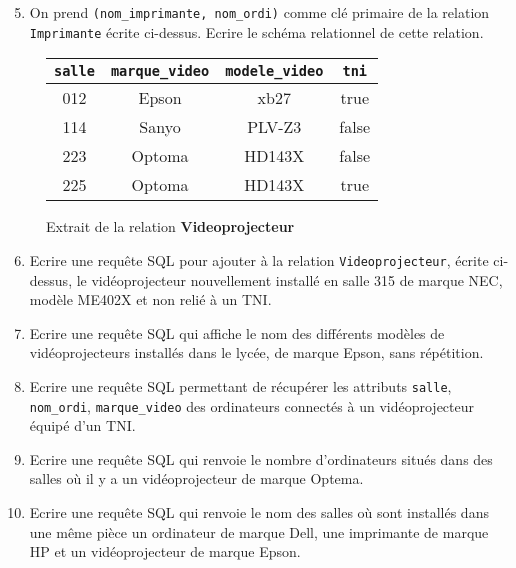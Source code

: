 \documentclass[11pt,a4paper,french,twoside]{PMCours}
\begin{document}
\begin{enumerate}
\setcounter{enumi}{4}

\item On prend \verb'(nom_imprimante, nom_ordi)' comme clé primaire de la relation \verb'Imprimante' écrite ci-dessus. Ecrire le schéma relationnel de cette relation.


\end{enumerate}


\begin{figure}[h]
\begin{center}
\begin{tabular}[c]{|c|c|c|c|}\hline
\verb'salle' & \verb'marque_video' & \verb'modele_video' & \verb'tni'  \\\hline
012 & Epson & xb27 & true  \\\hline
114 & Sanyo & PLV-Z3 & false  \\\hline
223 & Optoma & HD143X & false  \\\hline
225 & Optoma & HD143X & true  \\\hline
\end{tabular}
\end{center}
\caption{Extrait de la relation \textbf{Videoprojecteur}}
\end{figure}

\begin{enumerate}
\setcounter{enumi}{5}

\item Ecrire une requête SQL pour ajouter à la relation \verb'Videoprojecteur', écrite ci-dessus, le vidéoprojecteur nouvellement installé en salle 315 de marque NEC, modèle ME402X et non relié à un TNI.

\item Ecrire une requête SQL qui affiche le nom des différents modèles de vidéoprojecteurs installés dans le lycée, de marque Epson, sans répétition.

\item Ecrire une requête SQL permettant de récupérer les attributs \verb'salle', \verb'nom_ordi', \verb'marque_video' des ordinateurs connectés à un vidéoprojecteur équipé d'un TNI.

\item Ecrire une requête SQL qui renvoie le nombre d'ordinateurs situés dans des salles où il y a un vidéoprojecteur de marque Optema.

\item Ecrire une requête SQL qui renvoie le nom des salles où sont installés dans une même pièce un ordinateur de marque Dell, une imprimante de marque HP et un vidéoprojecteur de marque Epson.


\end{enumerate}
\end{document}
